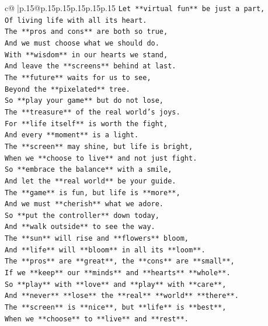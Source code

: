 \documentclass{article}
\begin{document}
{\begin{supertabular}{c@{$\;$}|p{.15\linewidth}@{}p{.15\linewidth}p{.15\linewidth}p{.15\linewidth}p{.15\linewidth}p{.15\linewidth}}
{{{\texttt{Let **virtual fun** be just a part,} \\
\texttt{Of living life with all its heart.} \\
\texttt{The **pros and cons** are both so true,} \\
\texttt{And we must choose what we should do.} \\
\texttt{With **wisdom** in our hearts we stand,} \\
\texttt{And leave the **screens** behind at last.} \\
\texttt{The **future** waits for us to see,} \\
\texttt{Beyond the **pixelated** tree.} \\
\texttt{So **play your game** but do not lose,} \\
\texttt{The **treasure** of the real world's joys.} \\
\texttt{For **life itself** is worth the fight,} \\
\texttt{And every **moment** is a light.} \\
\texttt{The **screen** may shine, but life is bright,} \\
\texttt{When we **choose to live** and not just fight.} \\
\texttt{So **embrace the balance** with a smile,} \\
\texttt{And let the **real world** be your guide.} \\
\texttt{The **game** is fun, but life is **more**,} \\
\texttt{And we must **cherish** what we adore.} \\
\texttt{So **put the controller** down today,} \\
\texttt{And **walk outside** to see the way.} \\
\texttt{The **sun** will rise and **flowers** bloom,} \\
\texttt{And **life** will **bloom** in all its **loom**.} \\
\texttt{The **pros** are **great**, the **cons** are **small**,} \\
\texttt{If we **keep** our **minds** and **hearts** **whole**.} \\
\texttt{So **play** with **love** and **play** with **care**,} \\
\texttt{And **never** **lose** the **real** **world** **there**.} \\
\texttt{The **screen** is **nice**, but **life** is **best**,} \\
\texttt{When we **choose** to **live** and **rest**.} \\
}}}
\end{supertabular}}
\end{document}

